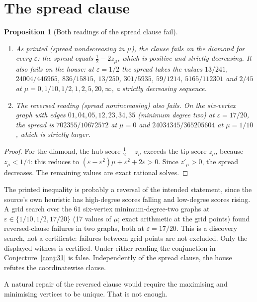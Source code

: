 \documentclass[11pt,a4paper]{article}
\newtheorem{proposition}[theorem]{Proposition}
\theoremstyle{definition}\newtheorem{conjecture}{Conjecture}
\theoremstyle{remark}\newtheorem{remark}[theorem]{Remark}
\newcommand{\eps}{\varepsilon}
\begin{document}
\section{The spread clause}\label{sec:spread}
\begin{proposition}[Both readings of the spread clause fail]\label{prop:spread}
\begin{enumerate}
 \item As printed (spread nondecreasing in $\mu$), the clause fails on the diamond for every $\eps$: the spread equals $\tfrac12-2z_\mu$, which is positive and strictly decreasing. It also fails on the house: at $\eps=1/2$ the spread takes the values $13/241$, $24004/446965$, $836/15815$, $13/250$, $301/5935$, $59/1214$, $5165/112301$ and $2/45$ at $\mu=0,1/10,1/2,1,2,5,20,\infty$, a strictly decreasing sequence.
 \item The reversed reading (spread nonincreasing) also fails. On the six-vertex graph with edges $01,04,05,12,23,34,35$ (minimum degree two) at $\eps=17/20$, the spread is $702355/10672572$ at $\mu=0$ and $24034345/365205604$ at $\mu=1/10$, which is strictly larger.
\end{enumerate}
\end{proposition}
\begin{proof}
For the diamond, the hub score $\frac12-z_\mu$ exceeds the tip score $z_\mu$, because $z_\mu<1/4$: this reduces to $(\eps-\eps^2)\mu+\eps^2+2\eps>0$. Since $z'_\mu>0$, the spread decreases. The remaining values are exact rational solves.
\end{proof}
The printed inequality is probably a reversal of the intended statement, since the source's own heuristic has high-degree scores falling and low-degree scores rising. A grid search over the $61$ six-vertex minimum-degree-two graphs at $\eps\in\{1/10,1/2,17/20\}$ (17 values of $\mu$; exact arithmetic at the grid points) found reversed-clause failures in two graphs, both at $\eps=17/20$. This is a discovery search, not a certificate: failures between grid points are not excluded. Only the displayed witness is certified. Under either reading the conjunction in Conjecture~\ref{conj:31} is false. Independently of the spread clause, the house refutes the coordinatewise clause.

A natural repair of the reversed clause would require the maximising and minimising vertices to be unique. That is not enough.
\end{document}
